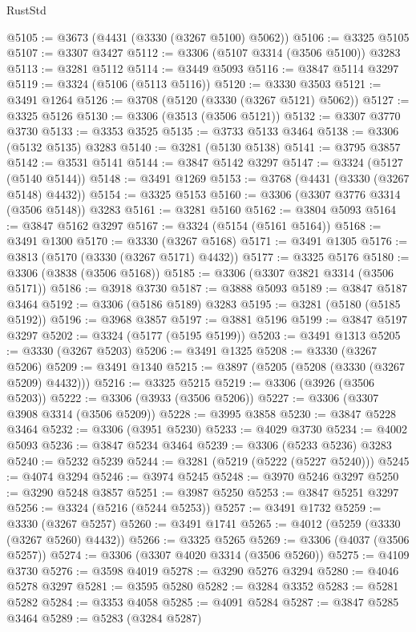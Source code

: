 \begin{lexlean}{RustStd}
\begin{coremodule}
@5105 := @3673 (@4431 (@3330 (@3267 @5100) @5062))
@5106 := @3325 @5105
@5107 := @3307 @3427
@5112 := @3306 (@5107 @3314 (@3506 @5100)) @3283
@5113 := @3281 @5112
@5114 := @3449 @5093
@5116 := @3847 @5114 @3297
@5119 := @3324 (@5106 (@5113 @5116))
@5120 := @3330 @3503
@5121 := @3491 @1264
@5126 := @3708 (@5120 (@3330 (@3267 @5121) @5062))
@5127 := @3325 @5126
@5130 := @3306 (@3513 (@3506 @5121))
@5132 := @3307 @3770 @3730
@5133 := @3353 @3525
@5135 := @3733 @5133 @3464
@5138 := @3306 (@5132 @5135) @3283
@5140 := @3281 (@5130 @5138)
@5141 := @3795 @3857
@5142 := @3531 @5141
@5144 := @3847 @5142 @3297
@5147 := @3324 (@5127 (@5140 @5144))
@5148 := @3491 @1269
@5153 := @3768 (@4431 (@3330 (@3267 @5148) @4432))
@5154 := @3325 @5153
@5160 := @3306 (@3307 @3776 @3314 (@3506 @5148)) @3283
@5161 := @3281 @5160
@5162 := @3804 @5093
@5164 := @3847 @5162 @3297
@5167 := @3324 (@5154 (@5161 @5164))
@5168 := @3491 @1300
@5170 := @3330 (@3267 @5168)
@5171 := @3491 @1305
@5176 := @3813 (@5170 (@3330 (@3267 @5171) @4432))
@5177 := @3325 @5176
@5180 := @3306 (@3838 (@3506 @5168))
@5185 := @3306 (@3307 @3821 @3314 (@3506 @5171))
@5186 := @3918 @3730
@5187 := @3888 @5093
@5189 := @3847 @5187 @3464
@5192 := @3306 (@5186 @5189) @3283
@5195 := @3281 (@5180 (@5185 @5192))
@5196 := @3968 @3857
@5197 := @3881 @5196
@5199 := @3847 @5197 @3297
@5202 := @3324 (@5177 (@5195 @5199))
@5203 := @3491 @1313
@5205 := @3330 (@3267 @5203)
@5206 := @3491 @1325
@5208 := @3330 (@3267 @5206)
@5209 := @3491 @1340
@5215 := @3897 (@5205 (@5208 (@3330 (@3267 @5209) @4432)))
@5216 := @3325 @5215
@5219 := @3306 (@3926 (@3506 @5203))
@5222 := @3306 (@3933 (@3506 @5206))
@5227 := @3306 (@3307 @3908 @3314 (@3506 @5209))
@5228 := @3995 @3858
@5230 := @3847 @5228 @3464
@5232 := @3306 (@3951 @5230)
@5233 := @4029 @3730
@5234 := @4002 @5093
@5236 := @3847 @5234 @3464
@5239 := @3306 (@5233 @5236) @3283
@5240 := @5232 @5239
@5244 := @3281 (@5219 (@5222 (@5227 @5240)))
@5245 := @4074 @3294
@5246 := @3974 @5245
@5248 := @3970 @5246 @3297
@5250 := @3290 @5248 @3857
@5251 := @3987 @5250
@5253 := @3847 @5251 @3297
@5256 := @3324 (@5216 (@5244 @5253))
@5257 := @3491 @1732
@5259 := @3330 (@3267 @5257)
@5260 := @3491 @1741
@5265 := @4012 (@5259 (@3330 (@3267 @5260) @4432))
@5266 := @3325 @5265
@5269 := @3306 (@4037 (@3506 @5257))
@5274 := @3306 (@3307 @4020 @3314 (@3506 @5260))
@5275 := @4109 @3730
@5276 := @3598 @4019
@5278 := @3290 @5276 @3294
@5280 := @4046 @5278 @3297
@5281 := @3595 @5280
@5282 := @3284 @3352
@5283 := @5281 @5282
@5284 := @3353 @4058
@5285 := @4091 @5284
@5287 := @3847 @5285 @3464
@5289 := @5283 (@3284 @5287)

\end{coremodule}
\end{lexlean}
